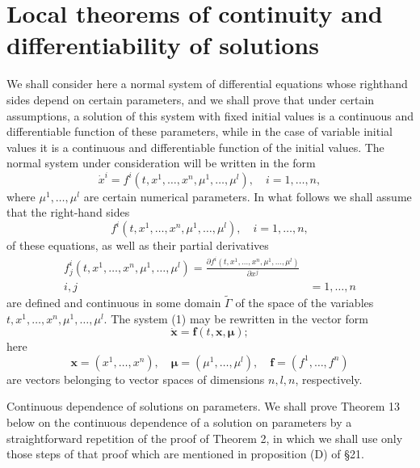\documentclass[10pt,a5paper]{book}
\theoremstyle{plain}
\theoremstyle{definition}
\theoremstyle{remark}
\begin{document}
\section{Local theorems of continuity and differentiability of solutions}
We shall consider here a normal system of differential equations whose righthand sides depend on certain parameters, and we shall prove that under certain assumptions, a solution of this system with fixed initial values is a continuous and differentiable function of these parameters, while in the case of variable initial values it is a continuous and differentiable function of the initial values. The normal system under consideration will be written in the form
\begin{equation*}
\dot{x}^{i}=f^{i}\left(t, x^{1}, \ldots, x^{n}, \mu^{1}, \ldots, \mu^{l}\right), \quad i=1, \ldots, n, \tag{1}
\end{equation*}
where $\mu^{1}, \ldots, \mu^{l}$ are certain numerical parameters. In what follows we shall assume that the right-hand sides
\begin{equation*}
f^{i}\left(t, x^{1}, \ldots, x^{n}, \mu^{1}, \ldots, \mu^{l}\right), \quad i=1, \ldots, n, \tag{2}
\end{equation*}
of these equations, as well as their partial derivatives
\begin{align*}
f_{j}^{i}\left(t, x^{1}, \ldots, x^{n}, \mu^{1}, \ldots, \mu^{l}\right)=\frac{\partial f^{i}\left(t, x^{1}, \ldots, x^{n}, \mu^{1}, \ldots, \mu^{l}\right)}{\partial x^{j}} & \\
i, j & =1, \ldots, n \tag{3}
\end{align*}
are defined and continuous in some domain $\widetilde{\Gamma}$ of the space of the variables $t, x^{1}, \ldots, x^{n}, \mu^{1}, \ldots, \mu^{l}$. The system (1) may be rewritten in the vector form
\begin{equation*}
\dot{\mathbf{x}}=\mathbf{f}(t, \mathbf{x}, \boldsymbol{\mu}) ; \tag{4}
\end{equation*}
here
\[
\mathbf{x}=\left(x^{1}, \ldots, x^{n}\right), \quad \boldsymbol{\mu}=\left(\mu^{1}, \ldots, \mu^{l}\right), \quad \mathbf{f}=\left(f^{1}, \ldots, f^{n}\right)
\]
are vectors belonging to vector spaces of dimensions $n, l, n$, respectively.

Continuous dependence of solutions on parameters. We shall prove Theorem 13 below on the continuous dependence of a solution on parameters by a straightforward repetition of the proof of Theorem 2, in which we shall use only those steps of that proof which are mentioned in proposition (D) of §21.
\end{document}
